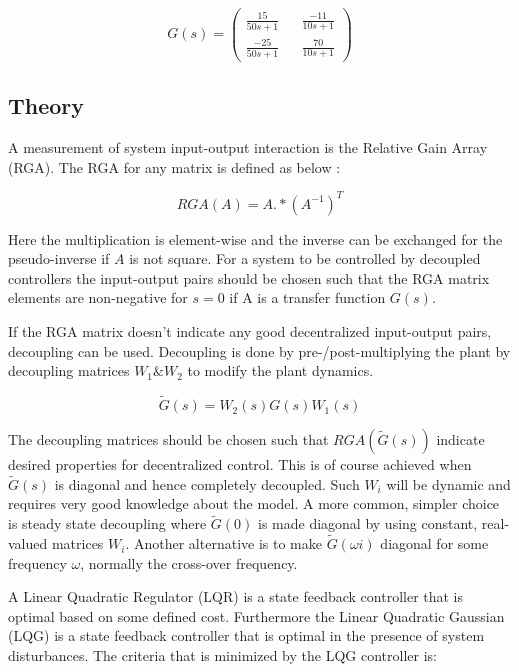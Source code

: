 \documentclass[a4paper, titlepage]{article}
\begin{document}
\begin{equation}
G(s) = 
\begin{pmatrix}
\frac{15}{50s + 1} && \frac{-11}{10s + 1} \\[6pt]
\frac{-25}{50s + 1} && \frac{70}{10s + 1}
\end{pmatrix}
\end{equation}

\subsection{Theory}

A measurement of system input-output interaction is the Relative Gain Array (RGA).
The RGA for any matrix is defined as below \citep[~p.219]{glad00}:

\begin{equation}
RGA(A) = A.*(A^{-1})^T
\end{equation}

Here the multiplication is element-wise and the inverse can be exchanged for the pseudo-inverse if $A$ is not square.
For a system to be controlled by decoupled controllers the input-output pairs should be chosen such that the RGA matrix elements are non-negative for $s=0$ if A is a transfer function $G(s)$.

If the RGA matrix doesn't indicate any good decentralized input-output pairs, decoupling can be used.
Decoupling is done by pre-/post-multiplying the plant by decoupling matrices $W_1 \& W_2$ to modify the plant dynamics.

\begin{equation}
\tilde{G}(s) = W_2(s)G(s)W_1(s)
\end{equation}

The decoupling matrices should be chosen such that $RGA(\tilde{G}(s))$ indicate desired properties for decentralized control.
This is of course achieved when $\tilde{G}(s)$ is diagonal and hence completely decoupled.
Such $W_i$ will be dynamic and requires very good knowledge about the model.
A more common, simpler choice is steady state decoupling where $\tilde{G}(0)$ is made diagonal by using constant, real-valued matrices $W_i$.
Another alternative is to make $\tilde{G}(\omega i)$ diagonal for some frequency $\omega$, normally the cross-over frequency. \citep[~p.226]{glad00}








A Linear Quadratic Regulator (LQR) is a state feedback controller that is optimal based on some defined cost.
Furthermore the Linear Quadratic Gaussian (LQG) is a state feedback controller that is optimal in the presence of system disturbances.
The criteria that is minimized by the LQG controller is:
\end{document}
